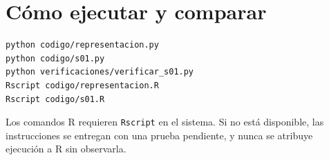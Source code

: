 \section{Cómo ejecutar y comparar}
\begin{lstlisting}
python codigo/representacion.py
python codigo/s01.py
python verificaciones/verificar_s01.py
Rscript codigo/representacion.R
Rscript codigo/s01.R
\end{lstlisting}
\noindent Los comandos R requieren \texttt{Rscript} en el sistema. Si no está disponible, las instrucciones se entregan con una prueba pendiente, y nunca se atribuye ejecución a R sin observarla.
